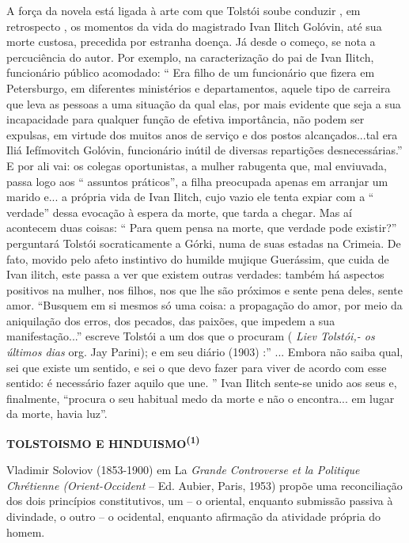 A força da novela está ligada à arte com que Tolstói soube conduzir , em
retrospecto , os momentos da vida do magistrado Ivan Ilitch Golóvin, até
sua morte custosa, precedida por estranha doença. Já desde o começo, se
nota a percuciência do autor. Por exemplo, na caracterização do pai de
Ivan Ilitch, funcionário público acomodado: `` Era filho de um
funcionário que fizera em Petersburgo, em diferentes ministérios e
departamentos, aquele tipo de carreira que leva as pessoas a uma
situação da qual elas, por mais evidente que seja a sua incapacidade
para qualquer função de efetiva importância, não podem ser expulsas, em
virtude dos muitos anos de serviço e dos postos alcançados...tal era
Iliá Iefímovitch Golóvin, funcionário inútil de diversas repartições
desnecessárias.'' E por ali vai: os colegas oportunistas, a mulher
rabugenta que, mal enviuvada, passa logo aos `` assuntos práticos'', a
filha preocupada apenas em arranjar um marido e... a própria vida de
Ivan Ilitch, cujo vazio ele tenta expiar com a `` verdade'' dessa
evocação à espera da morte, que tarda a chegar. Mas aí acontecem duas
coisas: `` Para quem pensa na morte, que verdade pode existir?''
perguntará Tolstói socraticamente a Górki, numa de suas estadas na
Crimeia. De fato, movido pelo afeto instintivo do humilde mujique
Guerássim, que cuida de Ivan ilitch, este passa a ver que existem outras
verdades: também há aspectos positivos na mulher, nos filhos, nos que
lhe são próximos e sente pena deles, sente amor. ``Busquem em si mesmos
só uma coisa: a propagação do amor, por meio da aniquilação dos erros,
dos pecados, das paixões, que impedem a sua manifestação...'' escreve
Tolstói a um dos que o procuram ( \emph{Liev Tolstói,- os últimos dias}
org. Jay Parini); e em seu diário (1903) :'' ... Embora não saiba qual,
sei que existe um sentido, e sei o que devo fazer para viver de acordo
com esse sentido: é necessário fazer aquilo que une. '' Ivan Ilitch
sente-se unido aos seus e, finalmente, ``procura o seu habitual medo da
morte e não o encontra... em lugar da morte, havia luz''.

\protect\hypertarget{_Hlk490065455}{}{}\textbf{TOLSTOISMO E
HINDUISMO\textsuperscript{(1)}}

Vladimir Soloviov (1853-1900) em La \emph{Grande Controverse et la
Politique Chrétienne (Orient-Occident} -- Ed. Aubier, Paris, 1953)
propõe uma reconciliação dos dois princípios constitutivos, um -- o
oriental, enquanto submissão passiva à divindade, o outro -- o
ocidental, enquanto afirmação da atividade própria do homem.

